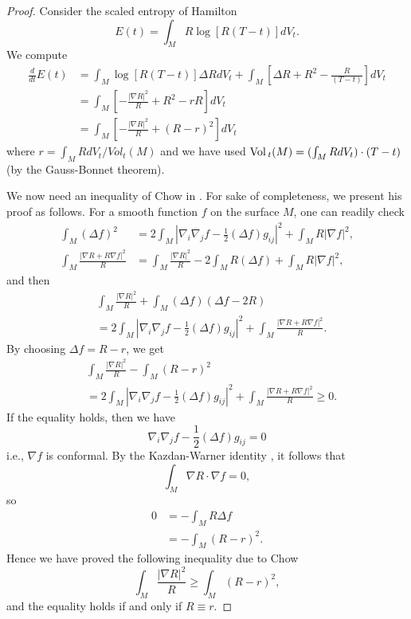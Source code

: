 \begin{proof}
Consider the scaled entropy of Hamilton \cite{Ha88}
$$
E(t)=\int_MR\log[R(T-t)]dV_t.
$$
We compute
\begin{align}
\frac{d}{dt}E(t)&  = \int_M \log[R(T-t)]\Delta
RdV_t+\int_M\left[\Delta R+R^2-\frac{R}{(T-t)}\right]dV_t\\
&  = \int_M\left[-\frac{|\nabla R|^2}{R}+R^2-rR\right]dV_t \nonumber\\
&  = \int_M\left[-\frac{|\nabla R|^2}{R}+(R-r)^2\right]dV_t \nonumber
\end{align}  %
where $r=\int_MRdV_t/Vol_t(M)$ and we have used
${\rm Vol}\,_t(M)=(\int_MRdV_t)\cdot(T-t)$ (by the Gauss-Bonnet theorem).

We now need an inequality of Chow in \cite{ChowE}. For sake of
completeness, we present his proof as follows. For a smooth function
$f$ on the surface $M$, one can readily check
\begin{align*}
\int_M(\Delta f)^2 &=2\int_M\left|\nabla_i\nabla_j
f-\frac{1}{2}(\Delta f)g_{ij}\right|^2
+\int_MR|\nabla f|^2, \\
\int_M\frac{|\nabla R+R\nabla f|^2}{R} &=\int_M\frac{|\nabla
R|^2}{R}-2\int_M R(\Delta f)+\int_MR|\nabla f|^2,
\end{align*}
and then
\begin{align*}
&\int_M\frac{|\nabla R|^2}{R}+\int_M(\Delta f)(\Delta f-2R)\\
&=2\int_M\left|\nabla_i\nabla_jf-\frac{1}{2}(\Delta
f)g_{ij}\right|^2 +\int_M\frac{|\nabla R+R\nabla f|^2}{R}.
\end{align*}
By choosing $\Delta f=R-r$, we get
\begin{align*}
&\int_M\frac{|\nabla R|^2}{R}-\int_M(R-r)^2 \\
&=2\int_M\left|\nabla_i\nabla_jf-\frac{1}{2}(\Delta
f)g_{ij}\right|^2 +\int_M\frac{|\nabla R+R\nabla f|^2}{R}\ge 0.
\end{align*}
If the equality holds, then we have
$$
\nabla_i\nabla_jf-\frac{1}{2}(\Delta f)g_{ij}=0
$$
i.e., $\nabla f$ is conformal. By the Kazdan-Warner identity
\cite{KW}, it follows that
$$
\int_M\nabla R\cdot \nabla f=0,
$$
so
\begin{align*}
0&  = -\int_MR\Delta f\\
&  = -\int_M(R-r)^2.
\end{align*}
Hence we have proved the following inequality due to Chow
\cite{ChowE} \begin{equation} \int_M\frac{|\nabla R|^2}{R}\ge\int_M(R-r)^2,
\end{equation} and the equality holds if and only if $R\equiv r$.


\end{proof}
